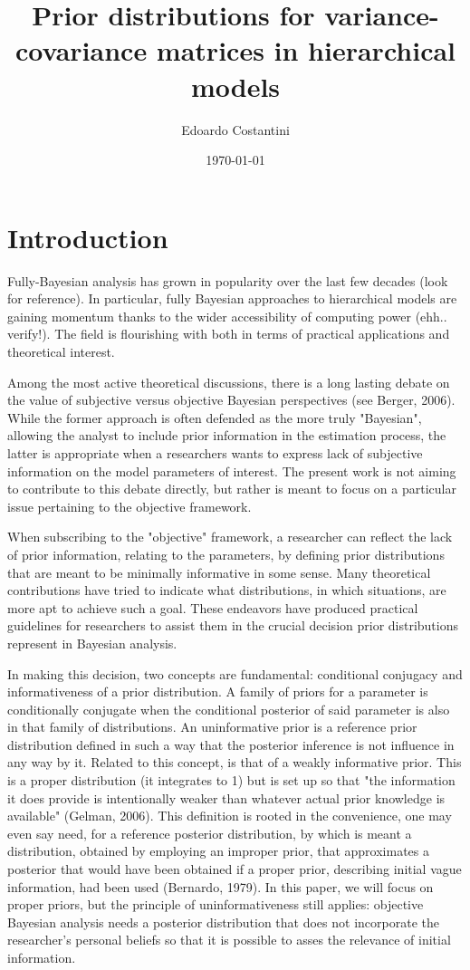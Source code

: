 \documentclass[a4paper]{article}
\title{Prior distributions for variance-covariance matrices in hierarchical models}
\author{Edoardo Costantini}
\date{\today}
\begin{document}
\maketitle

\section{Introduction}
Fully-Bayesian analysis has grown in popularity over the last few
decades (look for reference). In particular, fully Bayesian 
approaches to hierarchical models are gaining momentum thanks to
the wider accessibility of computing power (ehh.. verify!).  The field is flourishing
with both in terms of practical applications and theoretical interest.

Among the most active theoretical discussions, there is a long 
lasting debate on the value of subjective versus objective Bayesian 
perspectives (see Berger, 2006).  While the former approach is often 
defended as the more truly "Bayesian", allowing the analyst to
include prior information in the estimation process, the latter is 
appropriate when a researchers wants to express lack of subjective 
information on the model parameters of interest.  The present work 
is not aiming to contribute to this debate directly, but rather is meant to
focus on a particular issue pertaining to the objective framework.

When subscribing to the "objective" framework, a researcher
can reflect the lack of prior information, relating to the parameters, 
by defining prior distributions that are meant to be minimally 
informative in some sense.  Many theoretical contributions have tried 
to indicate what distributions, in which situations, are more apt to 
achieve such a goal.  These endeavors have produced practical guidelines 
for researchers to assist them in the crucial decision prior 
distributions represent in Bayesian analysis.  

In making this decision, two concepts are fundamental: conditional 
conjugacy and informativeness of a prior distribution. A family of 
priors for a parameter is conditionally conjugate when the conditional 
posterior of said parameter is also in that family of distributions.  
An uninformative prior is a reference prior distribution defined in 
such a way that the posterior inference is not influence in any way 
by it.  Related to this concept, is that of a weakly informative prior.  
This is a proper distribution (it integrates to 1) but is set up so 
that "the information it does provide is intentionally weaker than 
whatever actual prior knowledge is available" (Gelman, 2006).  This 
definition is rooted in the convenience, one may even say need, for 
a reference posterior distribution, by which is meant a distribution, 
obtained by employing an improper prior, that approximates a posterior 
that would have been obtained if a proper prior, describing initial 
vague information, had been used (Bernardo, 1979). In this paper, we 
will focus on proper priors, but the principle of uninformativeness 
still applies: objective Bayesian analysis needs a posterior 
distribution that does not incorporate the researcher's personal 
beliefs so that it is possible to asses the relevance of initial 
information.
\end{document}
